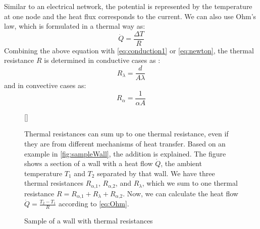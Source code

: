     Similar to an electrical network, the potential is represented by the temperature at one node and the heat flux corresponds to the current. We can also use Ohm's law, which is formulated in a thermal way as:  
     \begin{equation}
    \label{eq:Ohm}
        \dot{Q} = \frac{\Delta T}{R} 
    \end{equation}
    Combining the above equation with \autoref{eq:conduction1} or \autoref{eq:newton}, the thermal resistance $R$ is determined in conductive cases as \cite{Kuchling.2007}:
    \begin{equation}
    \label{eq:r_lambda}
        R_\lambda = \frac{d}{A\lambda}
    \end{equation}
   and in convective cases as\cite{Griesinger.2019}:
    \begin{equation}
        R_\alpha = \frac{1}{\alpha A}
    \end{equation}
    
    \begin{figure}[htbp]
    []{}
    \begin{minipage}[t]{7cm}
    \vspace{0pt}
    Thermal resistances can sum up to one thermal resistance, even if they are from different mechanisms of heat transfer. Based on an example in \autoref{fig:sampleWall}, the addition is explained. The figure shows a section of a wall with a heat flow $\dot{Q}$, the ambient temperature $T_\text{1}$ and $T_\text{2}$ separated by that wall. We have three thermal resistances $R_{\alpha\text{,1}}$, $R_{\alpha\text{,2}}$, and $R_\lambda$, which we sum to one thermal resistance $R = R_{\alpha\text{,1}} + R_\lambda + R_{\alpha\text{,2}}$. Now, we can calculate the heat flow $\dot{Q}= \frac{T_\text{2}-T_\text{1}}{R} $ according to \autoref{eq:Ohm}.
    \end{minipage}
    \hfill
    \begin{minipage}[t]{7cm}
    \vspace{0pt}
    \centering
    
    \caption{Sample of a wall with thermal resistances}
    \label{fig:sampleWall}
    \end{minipage}
    \end{figure}
    
